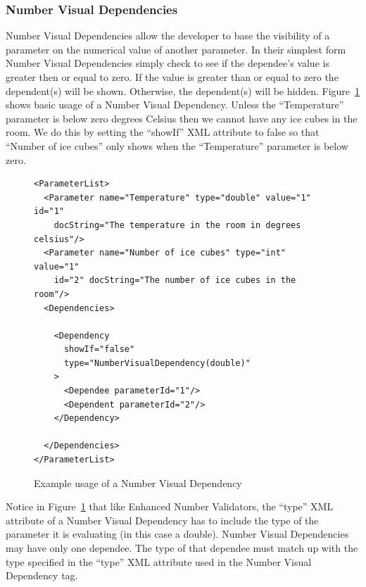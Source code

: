 \subsubsection{Number Visual Dependencies}
Number Visual Dependencies allow the developer to base the visibility of a parameter on the numerical value of another parameter. In their simplest form
Number Visual Dependencies simply check to see if the dependee's value is greater then or equal to zero. If the value is greater than or equal to zero the
dependent(s) will be shown. Otherwise, the dependent(s) will be hidden.
Figure~\ref{NumberVisXML1} shows basic usage of a Number Visual Dependency. Unless the ``Temperature'' parameter is below zero degrees
Celsius then we cannot have any ice cubes in the room. We do this by setting the ``showIf'' XML attribute to false so that ``Number of ice cubes'' only shows
when the ``Temperature'' parameter is below zero.
\begin{figure}
\centering
{\footnotesize
\begin{verbatim}
<ParameterList>
  <Parameter name="Temperature" type="double" value="1" id="1" 
    docString="The temperature in the room in degrees celsius"/>
  <Parameter name="Number of ice cubes" type="int" value="1"
    id="2" docString="The number of ice cubes in the room"/>
  <Dependencies>

    <Dependency 
      showIf="false" 
      type="NumberVisualDependency(double)"
    >
      <Dependee parameterId="1"/>
      <Dependent parameterId="2"/>
    </Dependency>

  </Dependencies>
</ParameterList>
\end{verbatim}
}
\caption{Example usage of a Number Visual Dependency}
\label{NumberVisXML1}
\end{figure}

Notice in Figure~\ref{NumberVisXML1} that like Enhanced Number Validators, the ``type'' XML attribute of a Number Visual Dependency has to include the type of the
parameter it is evaluating (in this case a double). Number Visual Dependencies may have only one dependee. The type of that dependee must match up with the
type specified in the ``type'' XML attribute used in the Number Visual Dependency tag.

